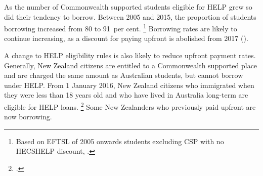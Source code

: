 \documentclass{grattan}
\begin{document}
As the number of \gls{Commonwealth supported} students eligible for \gls{HELP} grew so did their tendency to borrow.
Between 2005 and 2015, the proportion of students borrowing increased from 80 to 91~per cent.%
   \footnote{Based on \gls{EFTSL} of 2005 onwards students excluding CSP with no \gls{HECSHELP} discount, \textcite[][section 5: liability status categories]{EducationvariousyearsSelectedhighereducation}.} Borrowing rates are likely to continue increasing, as a discount for paying upfront is abolished from 2017 ().

A change to \gls{HELP} eligibility rules is also likely to reduce upfront payment rates.
Generally, New Zealand citizens are entitled to a \gls{Commonwealth supported} place and are charged the same amount as Australian students, but cannot borrow under \gls{HELP}\@.
From 1 January 2016, New Zealand citizens who immigrated when they were less than 18 years old and who have lived in Australia long-term are eligible for \gls{HELP} loans.%
\footcite{Education2016FAQsNewZealand} Some New Zealanders who previously paid upfront are now borrowing.
\end{document}

